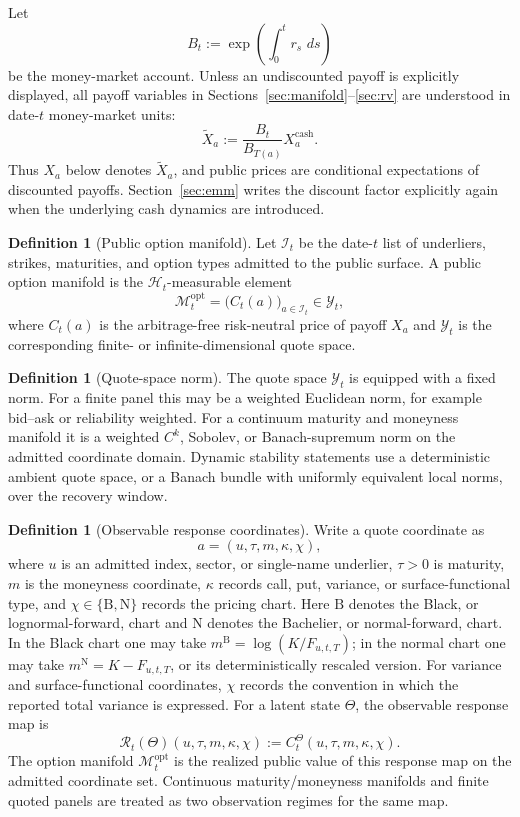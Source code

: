 \documentclass[11pt,a4paper]{amsart}
\theoremstyle{plain}
\theoremstyle{definition}
\newtheorem{definition}[theorem]{Definition}
\theoremstyle{remark}
\newcommand{\cH}{\mathcal{H}}
\newcommand{\cI}{\mathcal{I}}
\newcommand{\cM}{\mathcal{M}}
\newcommand{\cY}{\mathcal{Y}}
\newcommand{\dd}{\,d}
\begin{document}
Let
\[
        B_t:=\exp\!\left(\int_0^t r_s\,\dd s\right)
\]
be the money-market account.  Unless an undiscounted payoff is explicitly displayed, all payoff
variables in Sections~\ref{sec:manifold}--\ref{sec:rv} are understood in date-\(t\) money-market
units:
\[
        \widetilde X_a:=\frac{B_t}{B_{T(a)}}X_a^{\mathrm{cash}}.
\]
Thus \(X_a\) below denotes \(\widetilde X_a\), and public prices are conditional expectations of
discounted payoffs.  Section~\ref{sec:emm} writes the discount factor explicitly again when the
underlying cash dynamics are introduced.

\begin{definition}[Public option manifold]\label{def:option-manifold}
Let \(\cI_t\) be the date-\(t\) list of underliers, strikes, maturities, and option types admitted
to the public surface.  A public option manifold is the \(\cH_t\)-measurable element
\[
        \cM_t^{\mathrm{opt}}
        =
        \bigl(C_t(a)\bigr)_{a\in\cI_t}
        \in \cY_t,
\]
where \(C_t(a)\) is the arbitrage-free risk-neutral price of payoff \(X_a\) and \(\cY_t\) is the
corresponding finite- or infinite-dimensional quote space.
\end{definition}

\begin{definition}[Quote-space norm]\label{def:quote-space-norm}
The quote space \(\cY_t\) is equipped with a fixed norm.  For a finite panel this may be a
weighted Euclidean norm, for example bid--ask or reliability weighted.  For a continuum maturity
and moneyness manifold it is a weighted \(C^k\), Sobolev, or Banach-supremum norm on the admitted
coordinate domain.  Dynamic stability statements use a deterministic ambient quote space, or a
Banach bundle with uniformly equivalent local norms, over the recovery window.
\end{definition}

\begin{definition}[Observable response coordinates]\label{def:observable-response}
Write a quote coordinate as
\[
        a=(u,\tau,m,\kappa,\chi),
\]
where \(u\) is an admitted index, sector, or single-name underlier, \(\tau>0\) is maturity,
\(m\) is the moneyness coordinate, \(\kappa\) records call, put, variance, or
surface-functional type, and \(\chi\in\{\mathrm B,\mathrm N\}\) records the pricing chart.
Here \(\mathrm B\) denotes the Black, or lognormal-forward, chart and \(\mathrm N\) denotes the
Bachelier, or normal-forward, chart.  In the Black chart one may take
\(m^{\mathrm B}=\log(K/F_{u,t,T})\); in the normal chart one may take
\(m^{\mathrm N}=K-F_{u,t,T}\), or its deterministically rescaled version.  For variance and
surface-functional coordinates, \(\chi\) records the convention in which the reported total
variance is expressed.  For a latent state \(\Theta\), the observable response map is
\[
        \mathcal R_t(\Theta)(u,\tau,m,\kappa,\chi)
        :=
        C_t^\Theta(u,\tau,m,\kappa,\chi).
\]
The option manifold \(\cM_t^{\mathrm{opt}}\) is the realized public value of this response map on
the admitted coordinate set.  Continuous maturity/moneyness manifolds and finite quoted panels
are treated as two observation regimes for the same map.
\end{definition}
\end{document}
